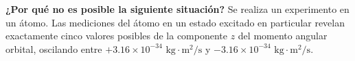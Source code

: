 \item \textbf{¿Por qué no es posible la siguiente situación?}
Se realiza un experimento en un átomo. Las mediciones del átomo en un estado excitado en particular revelan exactamente cinco valores posibles de la componente $z$ del momento angular orbital, oscilando entre $+3.16 \times 10^{-34}\text{ kg}\cdot\text{m}^2/\text{s}$ y $-3.16 \times 10^{-34}\text{ kg}\cdot\text{m}^2/\text{s}$.